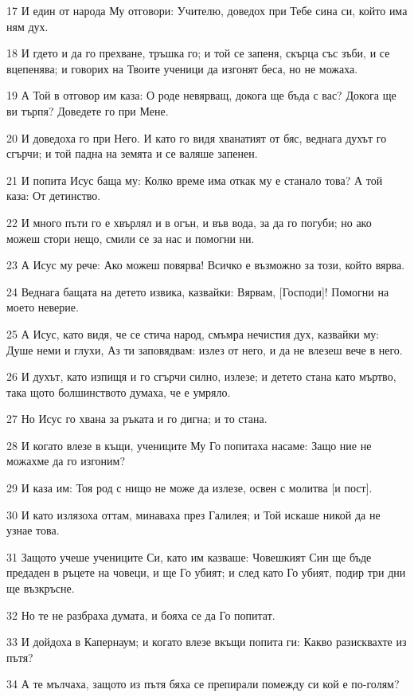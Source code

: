 \par 17 И един от народа Му отговори: Учителю, доведох при Тебе сина си, който има ням дух.
\par 18 И гдето и да го прехване, тръшка го; и той се запеня, скърца със зъби, и се вцепенява; и говорих на Твоите ученици да изгонят беса, но не можаха.
\par 19 А Той в отговор им каза: О роде невярващ, докога ще бъда с вас? Докога ще ви търпя? Доведете го при Мене.
\par 20 И доведоха го при Него. И като го видя хванатият от бяс, веднага духът го сгърчи; и той падна на земята и се валяше запенен.
\par 21 И попита Исус баща му: Колко време има откак му е станало това? А той каза: От детинство.
\par 22 И много пъти го е хвърлял и в огън, и във вода, за да го погуби; но ако можеш стори нещо, смили се за нас и помогни ни.
\par 23 А Исус му рече: Ако можеш повярва! Всичко е възможно за този, който вярва.
\par 24 Веднага бащата на детето извика, казвайки: Вярвам, [Господи]! Помогни на моето неверие.
\par 25 А Исус, като видя, че се стича народ, смъмра нечистия дух, казвайки му: Душе неми и глухи, Аз ти заповядвам: излез от него, и да не влезеш вече в него.
\par 26 И духът, като изпищя и го сгърчи силно, излезе; и детето стана като мъртво, така щото болшинството думаха, че е умряло.
\par 27 Но Исус го хвана за ръката и го дигна; и то стана.
\par 28 И когато влезе в къщи, учениците Му Го попитаха насаме: Защо ние не можахме да го изгоним?
\par 29 И каза им: Тоя род с нищо не може да излезе, освен с молитва [и пост].
\par 30 И като излязоха оттам, минаваха през Галилея; и Той искаше никой да не узнае това.
\par 31 Защото учеше учениците Си, като им казваше: Човешкият Син ще бъде предаден в ръцете на човеци, и ще Го убият; и след като Го убият, подир три дни ще възкръсне.
\par 32 Но те не разбраха думата, и бояха се да Го попитат.
\par 33 И дойдоха в Капернаум; и когато влезе вкъщи попита ги: Какво разисквахте из пътя?
\par 34 А те мълчаха, защото из пътя бяха се препирали помежду си кой е по-голям?
